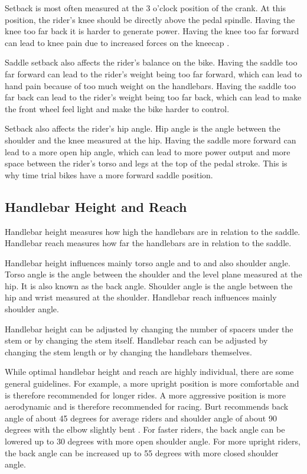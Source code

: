 Setback is most often measured at the 3 o'clock position of the crank. At this position, the rider's knee should be directly above the pedal spindle. Having the knee too far back it is harder to generate power. Having the knee too far forward can lead to knee pain due to increased forces on the kneecap \cite{burtbikefit}.

Saddle setback also affects the rider's balance on the bike. Having the saddle too far forward can lead to the rider's weight being too far forward, which can lead to hand pain because of too much weight on the handlebars. Having the saddle too far back can lead to the rider's weight being too far back, which can lead to make the front wheel feel light and make the bike harder to control.

Setback also affects the rider's hip angle. Hip angle is the angle between the shoulder and the knee measured at the hip. Having the saddle more forward can lead to a more open hip angle, which can lead to more power output and more space between the rider's torso and legs at the top of the pedal stroke. This is why time trial bikes have a more forward saddle position.



\subsection{Handlebar Height and Reach}
Handlebar height measures how high the handlebars are in relation to the saddle. Handlebar reach measures how far the handlebars are in relation to the saddle.

Handlebar height influences mainly torso angle and to and also shoulder angle. Torso angle is the angle between the shoulder and the level plane measured at the hip. It is also known as the back angle. Shoulder angle is the angle between the hip and wrist measured at the shoulder. Handlebar reach influences mainly shoulder angle.

Handlebar height can be adjusted by changing the number of spacers under the stem or by changing the stem itself. Handlebar reach can be adjusted by changing the stem length or by changing the handlebars themselves.

While optimal handlebar height and reach are highly individual, there are some general guidelines. For example, a more upright position is more comfortable and is therefore recommended for longer rides. A more aggressive position is more aerodynamic and is therefore recommended for racing. Burt recommends back angle of about 45 degrees for average riders and shoulder angle of about 90 degrees with the elbow slightly bent \cite{burtbikefit}. For faster riders, the back angle can be lowered up to 30 degrees with more open shoulder angle. For more upright riders, the back angle can be increased up to 55 degrees with more closed shoulder angle.


